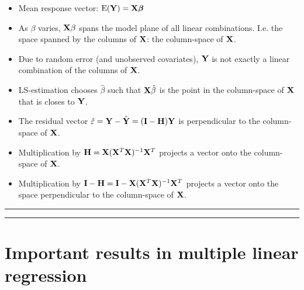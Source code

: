 \documentclass[]{article}
\providecommand{\tightlist}{%
  \setlength{\itemsep}{0pt}\setlength{\parskip}{0pt}}
\begin{document}
\begin{itemize}
\tightlist
\item
  Mean response vector: \(\text{E}({\bf Y})={\bf X}{\boldsymbol \beta}\)
\item
  As \(\beta\) varies, \({\bf X}\beta\) spans the model plane of all
  linear combinations. I.e. the space spanned by the columns of
  \({\bf X}\): the column-space of \({\bf X}\).
\item
  Due to random error (and unobserved covariates), \({\bf Y}\) is not
  exactly a linear combination of the columns of \({\bf X}\).
\item
  LS-estimation chooses \(\hat{\beta}\) such that \({\bf X}\hat{\beta}\)
  is the point in the column-space of \({\bf X}\) that is closes to
  \({\bf Y}\).
\item
  The residual vector
  \(\hat{\varepsilon}={\bf Y}-\hat{{\bf Y}}=({\bf I-H}){\bf Y}\) is
  perpendicular to the column-space of \({\bf X}\).
\item
  Multiplication by \({\bf H}={\bf X}({\bf X}^T{\bf X})^{-1}{\bf X}^T\)
  projects a vector onto the column-space of \({\bf X}\).
\item
  Multiplication by
  \({\bf I-H}={\bf I}-{\bf X}({\bf X}^T{\bf X})^{-1}{\bf X}^T\) projects
  a vector onto the space perpendicular to the column-space of
  \({\bf X}\).
\end{itemize}

\begin{center}\rule{0.5\linewidth}{\linethickness}\end{center}

\begin{center}\rule{0.5\linewidth}{\linethickness}\end{center}

\hypertarget{important-results-in-multiple-linear-regression}{%
\section{Important results in multiple linear
regression}\label{important-results-in-multiple-linear-regression}}
\end{document}
